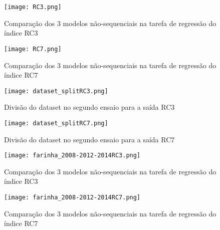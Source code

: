 \begin{figure}[H]
\centering
\texttt{[image: RC3.png]}
\caption{Comparação dos 3 modelos não-sequenciais na tarefa de regressão do índice RC3}
\end{figure}

\begin{figure}[H]
\centering
\texttt{[image: RC7.png]}
\caption{Comparação dos 3 modelos não-sequenciais na tarefa de regressão do índice RC7}
\end{figure}

\begin{figure}[H]
\centering
\texttt{[image: dataset\_splitRC3.png]}
\caption{Divisão do dataset no segundo ensaio para a saída RC3}
\end{figure}

\begin{figure}[H]
\centering
\texttt{[image: dataset\_splitRC7.png]}
\caption{Divisão do dataset no segundo ensaio para a saída RC7}
\end{figure}

\begin{figure}[H]
\centering
\texttt{[image: farinha\_2008-2012-2014RC3.png]}
\caption{Comparação dos 3 modelos não-sequenciais na tarefa de regressão do índice RC3}
\end{figure}

\begin{figure}[H]
\centering
\texttt{[image: farinha\_2008-2012-2014RC7.png]}
\caption{Comparação dos 3 modelos não-sequenciais na tarefa de regressão do índice RC7}
\end{figure}


